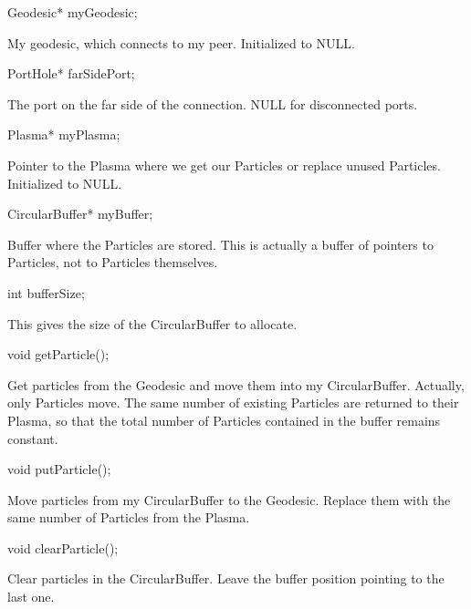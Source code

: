 \begin{example}
Geodesic* myGeodesic;
\end{example}

My geodesic, which connects to my peer.  Initialized to NULL.

\begin{example}
PortHole* farSidePort;
\end{example}

The port on the far side of the connection.  NULL for disconnected ports.

\begin{example}
Plasma* myPlasma;
\end{example}

Pointer to the Plasma where we get our Particles or replace unused
Particles.  Initialized to NULL.

\begin{example}
CircularBuffer* myBuffer;
\end{example}

Buffer where the Particles are stored.  This is actually a buffer of
pointers to Particles, not to Particles themselves.

\begin{example}
int bufferSize;
\end{example}

This gives the size of the CircularBuffer to allocate.

\begin{example}
void getParticle();
\end{example}

Get  particles from the Geodesic and move them into
my CircularBuffer.  Actually, only Particles move.  The same number of
existing Particles are returned to their Plasma, so that the total
number of Particles contained in the buffer remains constant.

\begin{example}
void putParticle();
\end{example}

Move  particles from my CircularBuffer to the
Geodesic.  Replace them with the same number of Particles from the Plasma.

\begin{example}
void clearParticle();
\end{example}

Clear  particles in the CircularBuffer.  Leave the
buffer position pointing to the last one.

